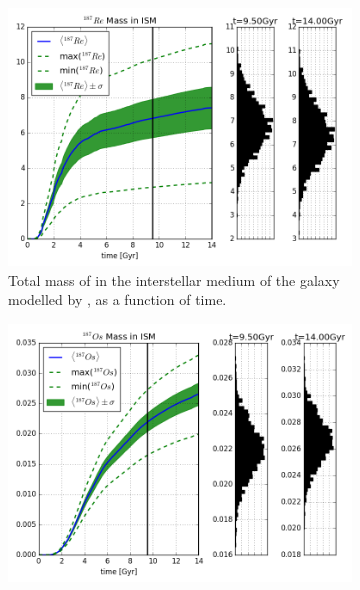 \begin{figure}[h]
  \begin{subfigure}[t][][t]{\subfigwidth}
    \includegraphics[width=\linewidth]{results/MCExperiment_revised_2/combined_plot_Re-187.png}
    \caption{\label{fig:MCExperiment-nodecay-re187} \footnotesize
      Total mass of  in the interstellar medium of the galaxy modelled by \omegamodel, as a function of time.
  }
  \end{subfigure} \hfill
  \begin{subfigure}[t][][t]{\subfigwidth}
    \centering
    \includegraphics[width=\linewidth]{results/MCExperiment_revised_2/combined_plot_Os-187.png}

\end{subfigure}
\end{figure}
